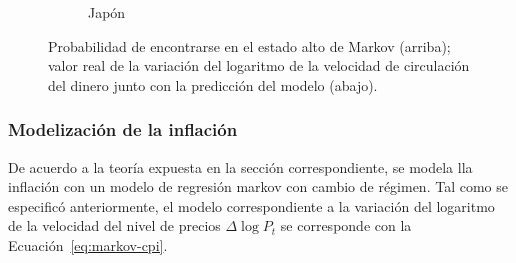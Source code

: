 \documentclass[titlepage, 12pt]{article}
\begin{document}
\begin{figure}
\begin{subfigure}[b]{0.49\textwidth}
        \caption{Japón}
    \end{subfigure}
    \caption{Probabilidad de encontrarse en el estado alto de Markov (arriba); valor real de la variación del logaritmo de la velocidad de circulación del dinero junto con la predicción del modelo (abajo).}
    \label{fig:markov-v}
\end{figure}

\subsubsection{Modelización de la inflación}

De acuerdo a la teoría expuesta en la sección correspondiente, se modela lla inflación con un modelo de regresión markov con cambio de régimen. Tal como se especificó anteriormente, el modelo correspondiente a la variación del logaritmo de la velocidad del nivel de precios $\Delta\log P_t$ se corresponde con la Ecuación~\ref{eq:markov-cpi}.
\end{document}
